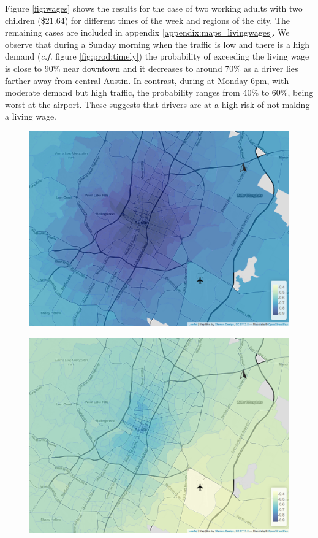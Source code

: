 \documentclass[a4paper, 11pt]{article}
\begin{document}
Figure \ref{fig:wages} shows the results for the case of two working adults with two children (\$21.64) for different times of the week and regions of the city. The remaining cases are included in appendix \ref{appendix:maps_livingwages}. We observe that during a Sunday morning when the traffic is low and there is a high demand (\textit{c.f.} figure \ref{fig:prod:timely}) the probability of exceeding the living wage is close to 90\% near downtown and it decreases to around 70\% as a driver lies farther away from central Austin. In contrast, during at Monday 6pm, with moderate demand but high traffic, the probability ranges from 40\% to 60\%, being worst at the airport. These suggests that drivers are at a high risk of not making a living wage.

\begin{figure}[tb]
    \centering
    \begin{minipage}[tb]{0.48\linewidth}
        \centering
        \includegraphics[width=\linewidth]{img/tailprob_21_64__9.png}
        \label{fig:wages:a}
    \end{minipage}
    \begin{minipage}[tb]{0.48\linewidth}
        \centering
        \includegraphics[width=\linewidth]{img/tailprob_21_64__43.png}

\end{minipage}
\end{figure}
\end{document}
